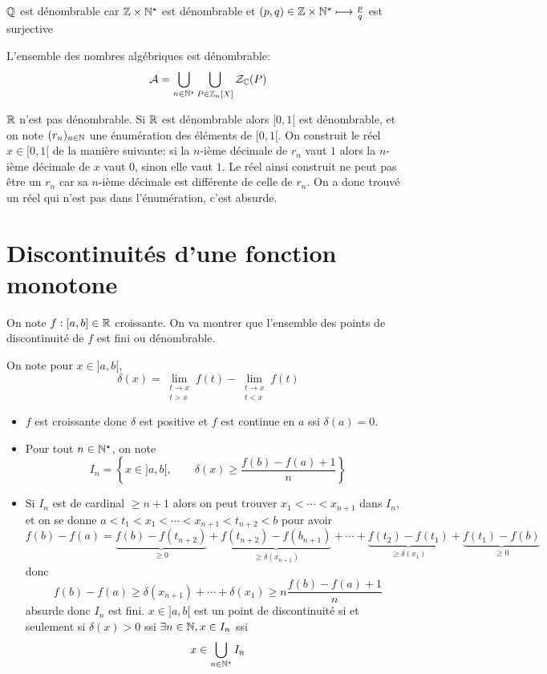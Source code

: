 \begin{ex}
    $\mathbb Q$ est dénombrable car $\mathbb Z\times \mathbb N^\star$ est dénombrable et $(p, q)\in\mathbb Z\times \mathbb N^\star\longmapsto \frac pq$ est surjective
\end{ex}

\begin{ex}
    L'ensemble des nombres algébriques est dénombrable: \[
        \mathcal A=\bigcup_{n\in\mathbb N^\star}\bigcup_{P\in\mathbb Z_n[X]}\mathcal Z_{\mathbb C}(P)
    \]
\end{ex}

\begin{ex}
    $\mathbb R$ n'est pas dénombrable. Si $\mathbb R$ est dénombrable alors $[0, 1[$ est dénombrable, et on note $(r_n)_{n\in\mathbb N}$ une énumération des éléments de $[0, 1[$. On construit le réel $x\in [0, 1[$ de la manière suivante: si la $n$-ième décimale de $r_n$ vaut $1$ alors la $n$-ième décimale de $x$ vaut $0$, sinon elle vaut $1$. Le réel ainsi construit ne peut pas être un $r_n$ car sa $n$-ième décimale est différente de celle de $r_n$. On a donc trouvé un réel qui n'est pas dans l'énumération, c'est absurde.
\end{ex}

\section{Discontinuités d'une fonction monotone}

On note $f:[a, b]\in\mathbb R$ croissante. On va montrer que l'ensemble des points de discontinuité de $f$ est fini ou dénombrable.

On note pour $x\in ]a, b[$, \[
    \delta(x)=\lim_{\substack{t\to x\\t>x}}f(t)-\lim_{\substack{t\to x\\t<x}}f(t)
\]

\begin{itemize}
    \item $f$ est croissante donc $\delta$ est positive et $f$ est continue en $a$ ssi $\delta(a)=0$.
    \item Pour tout $n\in\mathbb N^\star$, on note \[
            I_n= \left\{ x\in ]a, b[, \qquad \delta(x)\geq \frac{f(b)-f(a)+1}n \right\}
        \]
    \item Si $I_n$ est de cardinal $\geq n+1$ alors on peut trouver $x_1< \cdots< x_{n+1}$ dans $I_n$, et on se donne $a<t_1<x_1<\cdots <x_{n+1}<t_{n+2}<b$ pour avoir \[
            f(b)-f(a)=\underbrace{f(b)-f(t_{n+2})}_{\geq 0}+\underbrace{f(t_{n+2})-f(b_{n+1})}_{\geq \delta(x_{n+1})} +\cdots +\underbrace{f(t_2)-f(t_1)}_{\geq \delta(x_1)}+\underbrace{f(t_1)-f(b)}_{\geq 0}
        \]
        donc \[
            f(b)-f(a)\geq \delta(x_{n+1})+\cdots +\delta(x_1)\geq n\frac{f(b)-f(a)+1}n
        \]
        absurde donc $I_n$ est fini. $x\in ]a, b[$ est un point de discontinuité si et seulement si $\delta(x)>0$ ssi $\exists n\in\mathbb N, x\in I_n$ ssi \[
            x\in \bigcup_{n\in\mathbb N^\star}I_n
        \]
\end{itemize}

